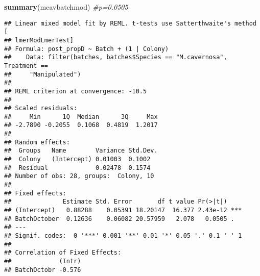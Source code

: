 \documentclass[]{article}
\newenvironment{Shaded}{\begin{snugshade}}{\end{snugshade}}
\newcommand{\CommentTok}[1]{\textcolor[rgb]{0.56,0.35,0.01}{\textit{#1}}}
\newcommand{\KeywordTok}[1]{\textcolor[rgb]{0.13,0.29,0.53}{\textbf{#1}}}
\newcommand{\NormalTok}[1]{#1}
\begin{document}
\begin{Shaded}
\begin{Highlighting}[]
\KeywordTok{summary}\NormalTok{(mcavbatchmod) }\CommentTok{#p=0.0505}
\end{Highlighting}
\end{Shaded}

\begin{verbatim}
## Linear mixed model fit by REML. t-tests use Satterthwaite's method [
## lmerModLmerTest]
## Formula: post_propD ~ Batch + (1 | Colony)
##    Data: filter(batches, batches$Species == "M.cavernosa", Treatment ==  
##     "Manipulated")
## 
## REML criterion at convergence: -10.5
## 
## Scaled residuals: 
##     Min      1Q  Median      3Q     Max 
## -2.7890 -0.2055  0.1068  0.4819  1.2017 
## 
## Random effects:
##  Groups   Name        Variance Std.Dev.
##  Colony   (Intercept) 0.01003  0.1002  
##  Residual             0.02478  0.1574  
## Number of obs: 28, groups:  Colony, 10
## 
## Fixed effects:
##              Estimate Std. Error       df t value Pr(>|t|)    
## (Intercept)   0.88288    0.05391 18.20147  16.377 2.43e-12 ***
## BatchOctober  0.12636    0.06082 20.57959   2.078   0.0505 .  
## ---
## Signif. codes:  0 '***' 0.001 '**' 0.01 '*' 0.05 '.' 0.1 ' ' 1
## 
## Correlation of Fixed Effects:
##             (Intr)
## BatchOctobr -0.576
\end{verbatim}
\end{document}
